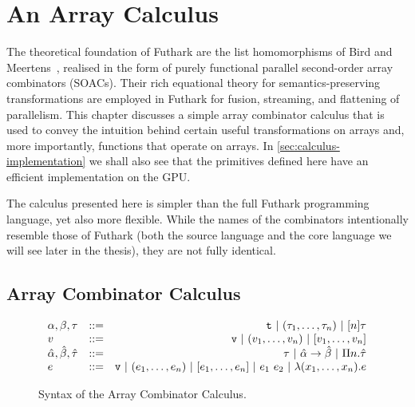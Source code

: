 \newcommand{\czip}{\mathrm{czip}}
\newcommand{\cunzip}{\mathrm{cunzip}}
\newcommand{\cmap}{\mathrm{map}}
\newcommand{\creduce}{\mathrm{reduce}}
\newcommand{\cscan}{\mathrm{scan}}
\newcommand{\cfilter}{\mathrm{scan}}
\newcommand{\inj}{\mathrm{inj}}
\newcommand{\rep}{\mathrm{rep}}
\newcommand{\csFold}{\mathrm{sFold}}
\newcommand{\credomap}{\mathrm{redomap}}
\newcommand{\seg}[1]{\mathbf{#1}}
\newcommand{\tto}{\,\Rightarrow\,}
\newcommand{\iso}{\,\Leftrightarrow\,}
\newcommand{\nat}{\mathbf{N}}
\newcommand{\concat}{\#}
\newcommand{\idd}{\mathrm{id}}
\newcommand{\Id}{\mathrm{id}}
\newcommand{\cfoldl}{\mathrm{foldl}}

\chapter{An Array Calculus}
\label{chap:calculus}

The theoretical foundation of Futhark are the list homomorphisms of
Bird and Meertens~\cite{Bird2}, realised in the form of purely
functional parallel second-order array combinators (SOACs). Their rich
equational theory for semantics-preserving transformations are
employed in Futhark for fusion, streaming, and flattening of
parallelism.  This chapter discusses a simple array combinator
calculus that is used to convey the intuition behind certain useful
transformations on arrays and, more importantly, functions that
operate on arrays.  In \cref{sec:calculus-implementation} we shall
also see that the primitives defined here have an efficient
implementation on the GPU.

The calculus presented here is simpler than the full Futhark
programming language, yet also more flexible.  While the names of the
combinators intentionally resemble those of Futhark (both the source
language and the core language we will see later in the thesis), they
are not fully identical.

\section{Array Combinator Calculus}
\label{sec:arraycombinators}

\begin{figure}
  \centering
$$
\begin{array}{lrr}
  \alpha,\beta,\tau & ::= & \mbox{\texttt{t}}\ |\ (\tau_1, \ldots, \tau_n)\ |\ [n]\tau \\

  v & ::= & \mbox{\texttt{v}}\ |\ (v_{1}, \ldots, v_{n})\ |\ [v_{1}, \ldots, v_{n}] \\

  \hat{\alpha},\hat{\beta},\hat{\tau} &::=& \tau\ |\ \hat{\alpha}\rightarrow\hat{\beta}\ |\ \Pi n.\hat{\tau} \\

  e &::=& \mbox{\texttt{v}}\ |\ (e_{1}, \ldots, e_{n})\ |\ [e_{1}, \ldots, e_{n}]\ |\ e_1~e_2\ |\ \lambda (x_1,\ldots,x_n).e
\end{array}
$$
  \caption{Syntax of the Array Combinator Calculus.}
  \label{fig:arraycalculus_syntax}
\end{figure}

